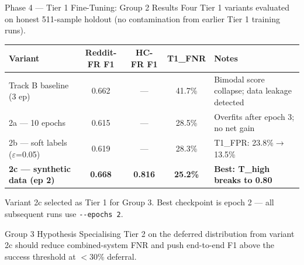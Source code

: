 \documentclass[aspectratio=169, 12pt]{beamer}
\newcommand{\good}[1]{\textcolor{okgreen}{\textbf{#1}}}
\begin{document}
\begin{frame}[shrink=25]{Phase 4 --- Tier 1 Fine-Tuning: Group 2 Results}
  \small
  Four Tier 1 variants evaluated on honest 511-sample holdout (no contamination from
  earlier Tier 1 training runs).\\[4pt]

  \scriptsize
  \begin{tabular}{lcccp{}}
    \toprule
    \textbf{Variant} & \textbf{Reddit-FR F1} & \textbf{HC-FR F1} & \textbf{T1\_FNR} & \textbf{Notes} \\
    \midrule
    Track B baseline (3 ep)
      & 0.662 & --- & 41.7\%
      & Bimodal score collapse; data leakage detected \\[3pt]
    2a --- 10 epochs
      & 0.615 & --- & 28.5\%
      & Overfits after epoch 3; no net gain \\[3pt]
    2b --- soft labels ($\varepsilon$=0.05)
      & 0.619 & --- & 28.3\%
      & T1\_FPR: 23.8\%$\to$13.5\% \\[3pt]
    \rowcolor{lightgray}
    \good{2c --- synthetic data (ep 2)}
      & \good{0.668} & \good{0.816} & \good{25.2\%}
      & \good{Best: T\_high breaks to 0.80} \\
    \bottomrule
  \end{tabular}

  \vspace{4pt}
  \small
  Variant 2c selected as Tier 1 for Group 3. Best checkpoint is epoch 2 --- all
  subsequent runs use \texttt{-{}-epochs 2}.

  \vspace{4pt}
  \begin{block}{Group 3 Hypothesis}
    Specialising Tier 2 on the deferred distribution from variant 2c should reduce
    combined-system FNR and push end-to-end F1 above the success threshold at $<$30\% deferral.
  \end{block}
\end{frame}
\end{document}
